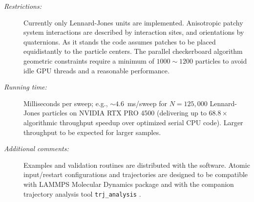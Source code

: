 \documentclass[final,5p,times,twocolumn]{elsarticle}
\begin{document}
{\begin{description}
    \item[\textit{Restrictions:}] Currently only Lennard-Jones units
      are implemented. Anisotropic patchy system interactions are described by
      interaction sites, 
    and orientations by quaternions. As it stands the code assumes
    patches to be placed equidistantly to the particle centers. The
    parallel checkerboard algorithm 
    geometric constraints require a minimum of $1000\sim 1200$
    particles to avoid idle GPU threads and a reasonable performance.  
  \item[\textit{Running time:}] Milliseconds per sweep; e.g., $\sim
    4.6$~ms/sweep for $N=125{,}000$ Lennard-Jones particles on NVIDIA
    RTX PRO 4500 
    (delivering up to $68.8\times$ algorithmic throughput speedup over
    optimized serial CPU code). Larger throughput to be expected for
    larger samples.
    \item[\textit{Additional comments:}] Examples and validation
      routines are distributed with the software. Atomic input/restart
      configurations and trajectories are designed to be compatible
      with LAMMPS Molecular Dynamics package
      \cite{thompson2022lammps} and with the companion trajectory
      analysis tool \texttt{trj\_analysis} \cite{trjanaly2026}.
\end{description}
}
\end{document}
